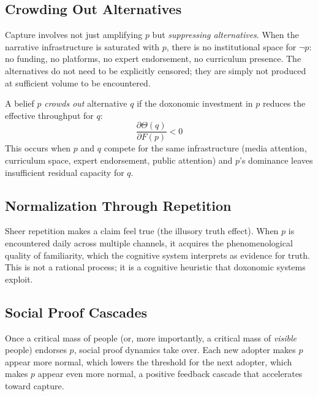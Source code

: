 \subsection{Crowding Out Alternatives}

Capture involves not just amplifying $p$ but \emph{suppressing alternatives}.
When the narrative infrastructure is saturated with $p$, there is no institutional space for $\neg p$: no funding, no platforms, no expert endorsement, no curriculum presence.
The alternatives do not need to be explicitly censored; they are simply not produced at sufficient volume to be encountered.

\begin{definition}
\label{def:crowding-out}
A belief $p$ \emph{crowds out} alternative $q$ if the doxonomic investment in $p$ reduces the effective throughput for $q$:
\[
  \frac{\partial \Theta(q)}{\partial F(p)} < 0
\]
This occurs when $p$ and $q$ compete for the same infrastructure (media attention, curriculum space, expert endorsement, public attention) and $p$'s dominance leaves insufficient residual capacity for $q$.
\end{definition}

\subsection{Normalization Through Repetition}

Sheer repetition makes a claim feel true (the illusory truth effect).
When $p$ is encountered daily across multiple channels, it acquires the phenomenological quality of familiarity, which the cognitive system interprets as evidence for truth.
This is not a rational process; it is a cognitive heuristic that doxonomic systems exploit.

\subsection{Social Proof Cascades}

Once a critical mass of people (or, more importantly, a critical mass of \emph{visible} people) endorses $p$, social proof dynamics take over.
Each new adopter makes $p$ appear more normal, which lowers the threshold for the next adopter, which makes $p$ appear even more normal, a positive feedback cascade that accelerates toward capture.

